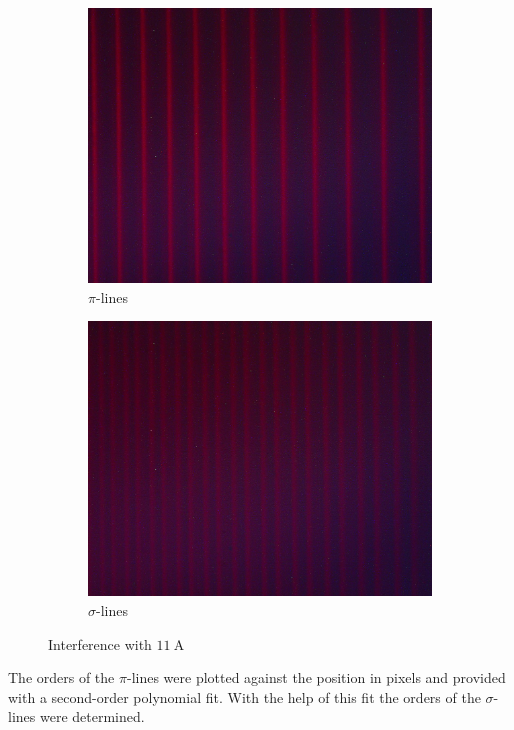 \begin{figure}[ht]
\centering
\begin{subfigure}{.24\textwidth}
\centering
\includegraphics[scale=.116]{images//pi.jpg}
\caption{$\pi$-lines}
\end{subfigure}
\begin{subfigure}{.24\textwidth}
\centering
\includegraphics[scale=.116]{images//sigma.jpg}
\caption{$\sigma$-lines}
\end{subfigure}
\caption{Interference with $\SI{11}{\ampere}$}
\label{fig:pisigma}
\end{figure}
The orders of the $\pi$-lines were plotted against the position in pixels and provided with a second-order polynomial fit.
With the help of this fit the orders of the $\sigma$-lines were determined.\\

